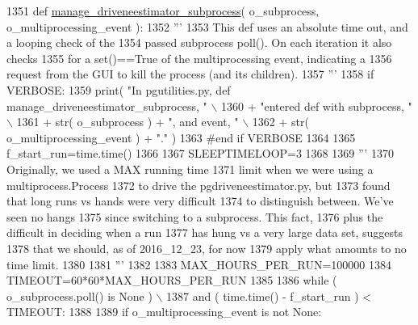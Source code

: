 \begin{DoxyCode}
1351 \textcolor{keyword}{def }\hyperlink{namespacenegui_1_1pgutilities_aa62ddf0928a977844669e59f5b4e3329}{manage\_driveneestimator\_subprocess}( o\_subprocess, 
      o\_multiprocessing\_event ):
1352     \textcolor{stringliteral}{'''}
1353 \textcolor{stringliteral}{    This def uses an absolute time out, and a looping check of the }
1354 \textcolor{stringliteral}{    passed subprocess poll(). On each iteration it also checks}
1355 \textcolor{stringliteral}{    for a set()==True of the multiprocessing event, indicating a}
1356 \textcolor{stringliteral}{    request from the GUI to kill the process (and its children).}
1357 \textcolor{stringliteral}{    '''}
1358     \textcolor{keywordflow}{if} VERBOSE:
1359         print( \textcolor{stringliteral}{"In pgutilities.py, def manage\_driveneestimator\_subprocess, "} \(\backslash\)
1360                             + \textcolor{stringliteral}{"entered def with subprocess, "} \(\backslash\)
1361                             + str( o\_subprocess ) + \textcolor{stringliteral}{", and event, "}  \(\backslash\)
1362                             + str( o\_multiprocessing\_event ) + \textcolor{stringliteral}{"."}  )
1363     \textcolor{comment}{#end if VERBOSE}
1364 
1365     f\_start\_run=time.time()
1366 
1367     SLEEPTIMELOOP=3
1368 
1369     \textcolor{stringliteral}{'''}
1370 \textcolor{stringliteral}{    Originally, we used a MAX running time}
1371 \textcolor{stringliteral}{    limit when we were using a multiprocess.Process}
1372 \textcolor{stringliteral}{    to drive the pgdriveneestimator.py, but}
1373 \textcolor{stringliteral}{    found that long runs vs hands were very difficult}
1374 \textcolor{stringliteral}{    to distinguish between.  We've seen no hangs}
1375 \textcolor{stringliteral}{    since switching to a subprocess.  This fact,}
1376 \textcolor{stringliteral}{    plus the difficult in deciding when a run}
1377 \textcolor{stringliteral}{    has hung vs a very large data set, suggests}
1378 \textcolor{stringliteral}{    that we should, as of 2016\_12\_23, for now }
1379 \textcolor{stringliteral}{    apply what amounts to no time limit.}
1380 \textcolor{stringliteral}{}
1381 \textcolor{stringliteral}{    '''}
1382 
1383     MAX\_HOURS\_PER\_RUN=100000
1384     TIMEOUT=60*60*MAX\_HOURS\_PER\_RUN
1385 
1386     \textcolor{keywordflow}{while} ( o\_subprocess.poll() \textcolor{keywordflow}{is} \textcolor{keywordtype}{None} ) \(\backslash\)
1387                         \textcolor{keywordflow}{and} ( time.time() - f\_start\_run ) < TIMEOUT:
1388 
1389         \textcolor{keywordflow}{if} o\_multiprocessing\_event \textcolor{keywordflow}{is} \textcolor{keywordflow}{not} \textcolor{keywordtype}{None}:

\end{DoxyCode}
